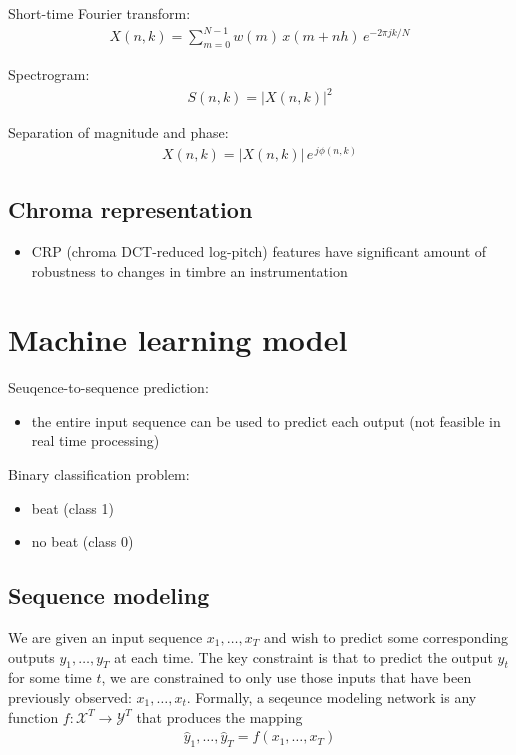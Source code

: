 \documentclass{article}
\begin{document}
Short-time Fourier transform:
\begin{align}
X(n,k) = \sum_{m = 0}^{N-1} w(m) \, x(m + n  h) \, e^{-2 \pi j  k /N}
\end{align} 

Spectrogram: 
\begin{align}
S(n,k) = |X(n,k)|^2
\end{align} 

Separation of magnitude and phase:
\begin{align} 
X(n,k) = |X(n,k)| \, e^{\, j \phi(n,k)}
\end{align} 


\subsection{Chroma representation}

\begin{itemize}
\item CRP (chroma DCT-reduced log-pitch) features have significant amount of robustness to changes in timbre an instrumentation \cite[Mueller2010]{Mueller2010}
\end{itemize}




\section{Machine learning model}

Seuqence-to-sequence prediction:
\begin{itemize}
\item the entire input sequence can be used to predict each output (not feasible in real time processing)
\end{itemize}

Binary classification problem:
\begin{itemize}
\item beat (class 1)
\item no beat (class 0)
\end{itemize}


\subsection{Sequence modeling}

We are given an input sequence $x_1, \dots, x_T$ and wish to predict some corresponding outputs $y_1, \dots, y_T$ at each time. The key constraint is that to predict the output $y_t$ for some time $t$, we are constrained to only use those inputs that have been previously observed: $x_1, \dots , x_t$. Formally, a seqeunce modeling network is any function $f : \mathcal X^{T} \rightarrow \mathcal Y^{T}$ that produces the mapping
\begin{align}
\hat y_1, \dots, \hat y_T = f(x_1,\dots, x_T)
\end{align}
\end{document}
